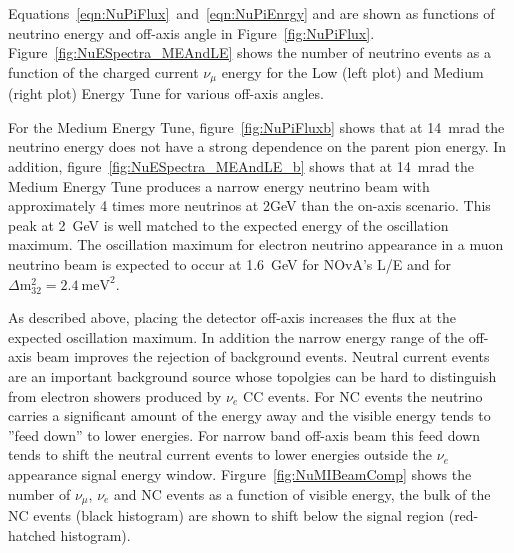 Equations~\ref{eqn:NuPiFlux}~and~\ref{eqn:NuPiEnrgy} and are shown as 
functions of neutrino energy and off-axis angle in
Figure~\ref{fig:NuPiFlux}.
Figure~\ref{fig:NuESpectra_MEAndLE} shows the number of neutrino
events as a function of the
charged current $\nu_{\mu}$ energy for the Low (left plot) and
Medium (right plot) Energy Tune for various off-axis angles. 

For the Medium Energy Tune, figure~\ref{fig:NuPiFluxb} shows that at
14~mrad the neutrino energy
does not have a strong dependence on the parent pion energy.
In addition, figure~\ref{fig:NuESpectra_MEAndLE_b} shows that at
14~mrad the Medium
Energy Tune produces a narrow energy neutrino beam with approximately
4 times more neutrinos at 2GeV than the on-axis scenario. This peak at
2~GeV is well matched to the expected energy of the oscillation
maximum. The oscillation maximum for electron neutrino appearance in a
muon neutrino beam is expected to occur at 1.6~GeV for
NOvA's L/E and for $\Delta \textrm{m}_{32}^2=2.4~\textrm{meV}^2$.

As described above, placing the detector off-axis increases the flux
at the expected oscillation maximum. In addition the narrow energy
range of the off-axis beam improves the rejection of background
events. Neutral current events are an important background source
whose topolgies can be hard to distinguish from electron showers
produced by $\nu_e$ CC events. For NC events the neutrino carries a
significant amount of the energy away and the visible energy tends to
''feed down'' to lower energies. For narrow band off-axis  beam this
feed down tends to shift the neutral current events to lower energies
outside the $\nu_e$ appearance signal energy window. Firgure~\ref{fig:NuMIBeamComp}
shows the number of $\nu_{\mu}$, $\nu_e$ and NC events as a function
of visible energy, the bulk of the NC events (black histogram) are shown to shift below
the signal region (red-hatched histogram).


